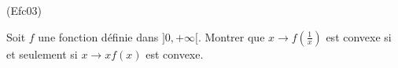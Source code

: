 \begin{tiny}(Efc03)\end{tiny}
Soit $f$ une fonction définie dans $]0,+\infty[$. Montrer que $x\rightarrow f(\frac{1}{x})$ est convexe si et seulement si $x\rightarrow xf(x)$ est convexe.